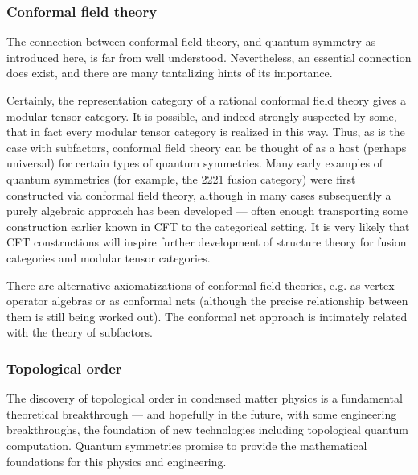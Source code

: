 \documentclass[11pt]{article}
\begin{document}
\subsubsection{Conformal field theory}

The connection between conformal field theory, and quantum symmetry as introduced here, is far from well understood. Nevertheless, an essential connection does exist, and there are many tantalizing hints of its importance.

Certainly, the representation category of a rational conformal field theory gives a modular tensor category. It is possible, and indeed strongly suspected by some, that in fact every modular tensor category is realized in this way.
Thus, as is the case with subfactors, conformal field theory can be thought of
as a host (perhaps universal) for certain types of quantum symmetries. Many early examples of quantum symmetries (for example, the 2221 fusion category) were first constructed via conformal field theory, although in many cases subsequently a purely algebraic approach has been developed --- often enough
transporting some construction earlier known in CFT to the categorical
setting. It is very likely that CFT constructions will inspire further
development of structure theory for fusion categories and modular tensor
categories.

There are alternative axiomatizations of conformal field theories, e.g.  as
vertex operator algebras or as conformal nets (although the precise
relationship between them is still being worked out). The conformal net
approach is intimately related with the theory of subfactors. 


\subsubsection{Topological order}

The discovery of topological order in condensed matter physics is a
fundamental theoretical breakthrough --- and hopefully in the future, with
some engineering breakthroughs, the foundation of new technologies including
topological quantum computation. Quantum symmetries promise to provide the
mathematical foundations for this physics and engineering.
\end{document}
